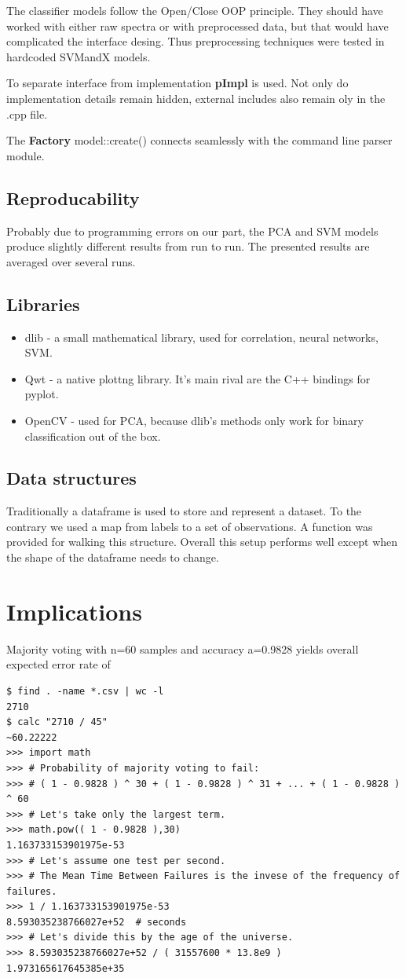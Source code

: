 \documentclass{article}
\begin{document}
The classifier models follow the Open/Close OOP principle.
They should have worked with either raw spectra or with preprocessed data, but that would have complicated the interface desing.
Thus preprocessing techniques were tested in hardcoded SVMandX models.

To separate interface from implementation \textbf{pImpl} is used.
Not only do implementation details remain hidden, external includes also remain oly in the .cpp file.

The \textbf{Factory} model::create() connects seamlessly with the command line parser module.

\subsection{Reproducability}
Probably due to programming errors on our part, the PCA and SVM models produce slightly different results from run to run.
The presented results are averaged over several runs.

\subsection{Libraries}
\begin{itemize}
\item{dlib - a small mathematical library, used for correlation, neural networks, SVM.}
\item{Qwt - a native plottng library. It's main rival are the C++ bindings for pyplot.}
\item{OpenCV - used for PCA, because dlib's methods only work for binary classification out of the box.}
\end{itemize}

\subsection{Data structures}
Traditionally a dataframe is used to store and represent a dataset.
To the contrary we used a map from labels to a set of observations.
A function was provided for walking this structure.
Overall this setup performs well except when the shape of the dataframe needs to change.


\section{Implications}
Majority voting with n=60 samples and accuracy a=0.9828 yields overall expected error rate of
\begin{verbatim}
$ find . -name *.csv | wc -l
2710
$ calc "2710 / 45"
~60.22222
>>> import math
>>> # Probability of majority voting to fail:
>>> # ( 1 - 0.9828 ) ^ 30 + ( 1 - 0.9828 ) ^ 31 + ... + ( 1 - 0.9828 ) ^ 60
>>> # Let's take only the largest term.
>>> math.pow(( 1 - 0.9828 ),30)
1.163733153901975e-53
>>> # Let's assume one test per second.
>>> # The Mean Time Between Failures is the invese of the frequency of failures.
>>> 1 / 1.163733153901975e-53
8.593035238766027e+52  # seconds
>>> # Let's divide this by the age of the universe.
>>> 8.593035238766027e+52 / ( 31557600 * 13.8e9 )
1.973165617645385e+35
\end{verbatim}
\end{document}
